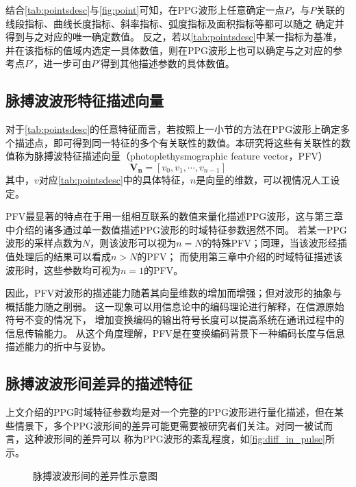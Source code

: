 结合\autoref{tab:pointsdesc}与\autoref{fig:point}可知，在PPG波形上任意确定一点$P$，与$P$关联的线段指标、曲线长度指标、斜率指标、弧度指标及面积指标等都可以随之
确定并得到与之对应的唯一确定数值。
反之，若以\autoref{tab:pointsdesc}中某一指标为基准，并在该指标的值域内选定一具体数值，则在PPG波形上也可以确定与之对应的参考点$P'$，进一步可由$P'$得到其他描述参数的具体数值。

\subsection{脉搏波波形特征描述向量}

对于\autoref{tab:pointsdesc}的任意特征而言，若按照上一小节的方法在PPG波形上确定多个描述点，即可得到同一特征的多个有关联性的数值。本研究将这些有关联性的数值称为脉搏波特征描述向量（photoplethysmographic feature vector，PFV）
\begin{equation}
    \label{equ:featurevector}
    \boldsymbol {V_n}=[v_0,v_1,\cdots,v_{n-1}]
\end{equation}
其中，$v$对应\autoref{tab:pointsdesc}中的具体特征，$n$是向量的维数，可以视情况人工设定。

PFV最显著的特点在于用一组相互联系的数值来量化描述PPG波形，这与第三章中介绍的诸多通过单一数值描述PPG波形的时域特征参数迥然不同。
若某一PPG波形的采样点数为$N$，则该波形可以视为$n=N$的特殊PFV；同理，当该波形经插值处理后的结果可以看成$n>N$的PFV；
而使用第三章中介绍的时域特征描述该波形时，这些参数均可视为$n=1$的PFV。

因此，PFV对波形的描述能力随着其向量维数的增加而增强；但对波形的抽象与概括能力随之削弱。
这一现象可以用信息论中的编码理论进行解释，在信源原始符号不变的情况下，
增加变换编码的输出符号长度可以提高系统在通讯过程中的信息传输能力\cite{Zhao2017}。
从这个角度理解，PFV是在变换编码背景下一种编码长度与信息描述能力的折中与妥协。

\subsection{脉搏波波形间差异的描述特征}
上文介绍的PPG时域特征参数均是对一个完整的PPG波形进行量化描述，但在某些情景下，多个PPG波形间的差异可能更需要被研究者们关注。对同一被试而言，这种波形间的差异可以
称为PPG波形的紊乱程度，如\autoref{fig:diff_in_pulse}所示。

\begin{figure}[htbp]
    \centering
    \quad
    \caption[脉搏波波形间的差异性示意图]{\label{fig:diff_in_pulse}脉搏波波形间的差异性示意图}
\end{figure}

